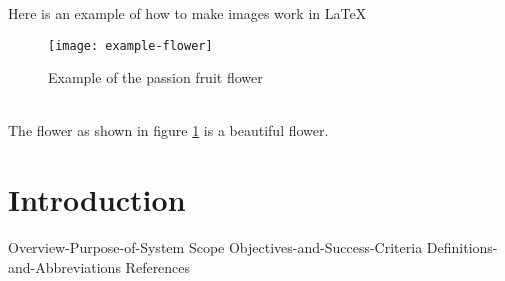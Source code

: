\newpage
Here is an example of how to make images work in \LaTeX \\
\begin{figure}[h]
\centering %
\texttt{[image: example-flower]} %
\caption{Example of the passion fruit flower}
\label{fig: passion-fruit-flower} %
\end{figure}
\\ %
The flower as shown in figure \ref{fig: passion-fruit-flower} is a beautiful flower.

\newpage
\section{Introduction} %

{Overview-Purpose-of-System}
{Scope}
{Objectives-and-Success-Criteria}
{Definitions-and-Abbreviations}
{References}
